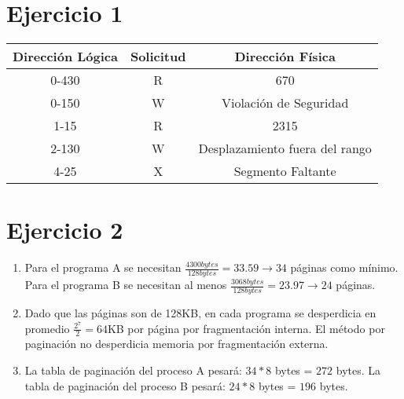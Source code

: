 \documentclass[12pt]{article}
\begin{document}
	\section*{Ejercicio 1}
	\begin{Large}
	\begin{center}
		\begin{tabular}{ c | c | c }
			\textbf{Dirección Lógica} & \textbf{Solicitud} & \textbf{Dirección Física} \\ \hline
			0-430 & R & 670 \\ 
			0-150 & W & Violación de Seguridad \\
			1-15 & R & 2315 \\
			2-130 & W & Desplazamiento fuera del rango \\
			4-25 & X & Segmento Faltante \\
		\end{tabular}
	\end{center}
	\end{Large}
	\section*{Ejercicio 2}
	\begin{enumerate}[label=\alph*)]
		\item Para el programa A se necesitan $\frac{4300 bytes}{128 bytes} = 33.59 \rightarrow 34$ páginas como mínimo. Para el programa B se necesitan al menos $\frac{3068 bytes}{128 bytes} = 23.97 \rightarrow 24$ páginas.
		\item Dado que las páginas son de 128KB, en cada programa se desperdicia en promedio $\frac{2^{7}}{2}= 64$KB por página por fragmentación interna. El método por paginación no desperdicia memoria por fragmentación externa.
		\item La tabla de paginación del proceso A pesará: $34 * 8$ bytes = $272$ bytes. La tabla de paginación del proceso B pesará: $24 * 8$ bytes = $196$ bytes.
	\end{enumerate}
\end{document}
